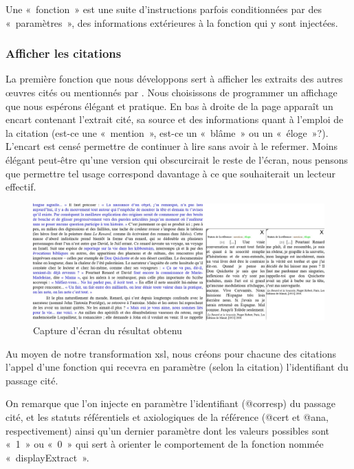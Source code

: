 Une «~fonction~» est une suite d'instructions parfois conditionnées par des «~paramètres~», des informations extérieures à la fonction qui y sont injectées.

\subsubsection{Afficher les citations}
\label{quote_dis}


La première fonction que nous développons sert à afficher les extraits des autres œuvres cités ou mentionnés par \robbe. Nous choisissons de programmer un affichage que nous espérons élégant et pratique. En bas à droite de la page apparaît un encart contenant l'extrait cité, sa source et des informations quant à l'emploi de la citation (est-ce une «~mention~», est-ce un «~blâme~» ou un «~éloge~»?). L'encart est censé permettre de continuer à lire \punr{} sans avoir à le refermer. Moins élégant peut-être qu'une version qui obscurcirait le reste de l'écran, nous pensons que permettre tel usage correspond davantage à ce que souhaiterait un lecteur effectif.
\begin{figure}[H]
    \centering
    \includegraphics[scale=0.55]{img/screen_quote_result.jpg}
    \caption{Capture d'écran du résultat obtenu}
    \label{fig:quote}
\end{figure}


Au moyen de notre transformation xsl, nous créons pour chacune des citations l'appel d'une fonction qui recevra en paramètre (selon la citation) l'identifiant du passage cité.


On remarque que l'on injecte en paramètre l'identifiant (@corresp) du passage cité, et les statuts référentiels et axiologiques de la référence (@cert et @ana, respectivement) ainsi qu'un dernier paramètre dont les valeurs possibles sont «~1~» ou «~0~» qui sert à orienter le comportement de la fonction nommée «~displayExtract~».

